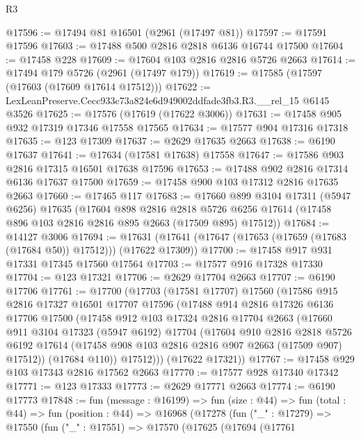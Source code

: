 \begin{lexlean}{R3}
\begin{coremodule}
@17596 := @17494 @81 @16501 (@2961 (@17497 @81))
@17597 := @17591 @17596
@17603 := @17488 @500 @2816 @2818 @6136 @16744 @17500
@17604 := @17458 @228
@17609 := @17604 @103 @2816 @2816 @5726 @2663
@17614 := @17494 @179 @5726 (@2961 (@17497 @179))
@17619 := @17585 (@17597 (@17603 (@17609 @17614 @17512)))
@17622 := LexLeanPreserve.Cecc933c73a824e6d949002ddfade3fb3.R3.__rel_15 @6145 @3526
@17625 := @17576 (@17619 (@17622 @3006))
@17631 := @17458 @905 @932 @17319 @17346 @17558 @17565
@17634 := @17577 @904 @17316 @17318
@17635 := @123 @17309
@17637 := @2629 @17635 @2663
@17638 := @6190 @17637
@17641 := @17634 (@17581 @17638) @17558
@17647 := @17586 @903 @2816 @17315 @16501 @17638 @17596
@17653 := @17488 @902 @2816 @17314 @6136 @17637 @17500
@17659 := @17458 @900 @103 @17312 @2816 @17635 @2663
@17660 := @17465 @117
@17683 := @17660
    @899
    @3104
    @17311
    (@5947 @6256)
    @17635
    (@17604
      @898
      @2816
      @2818
      @5726
      @6256
      @17614
      (@17458 @896 @103 @2816 @2816 @895 @2663 (@17509 @895) @17512))
@17684 := @14127 @3006
@17694 := @17631 (@17641 (@17647 (@17653 (@17659 (@17683 (@17684 @50)) @17512))) (@17622 @17309))
@17700 := @17458 @917 @931 @17331 @17345 @17560 @17564
@17703 := @17577 @916 @17328 @17330
@17704 := @123 @17321
@17706 := @2629 @17704 @2663
@17707 := @6190 @17706
@17761 := @17700
    (@17703
      (@17581 @17707)
      @17560
      (@17586
        @915
        @2816
        @17327
        @16501
        @17707
        @17596
        (@17488
          @914
          @2816
          @17326
          @6136
          @17706
          @17500
          (@17458
            @912
            @103
            @17324
            @2816
            @17704
            @2663
            (@17660
              @911
              @3104
              @17323
              (@5947 @6192)
              @17704
              (@17604
                @910
                @2816
                @2818
                @5726
                @6192
                @17614
                (@17458 @908 @103 @2816 @2816 @907 @2663 (@17509 @907) @17512))
              (@17684 @110))
            @17512)))
      (@17622 @17321))
@17767 := @17458 @929 @103 @17343 @2816 @17562 @2663
@17770 := @17577 @928 @17340 @17342
@17771 := @123 @17333
@17773 := @2629 @17771 @2663
@17774 := @6190 @17773
@17848 := fun (message : @16199) =>
  fun (size : @44) =>
  fun (total : @44) =>
  fun (position : @44) =>
  @16968
    (@17278
      (fun ("_" : @17279) =>
      @17550
        (fun ("_" : @17551) =>
        @17570
          (@17625
            (@17694
              (@17761

\end{coremodule}
\end{lexlean}
